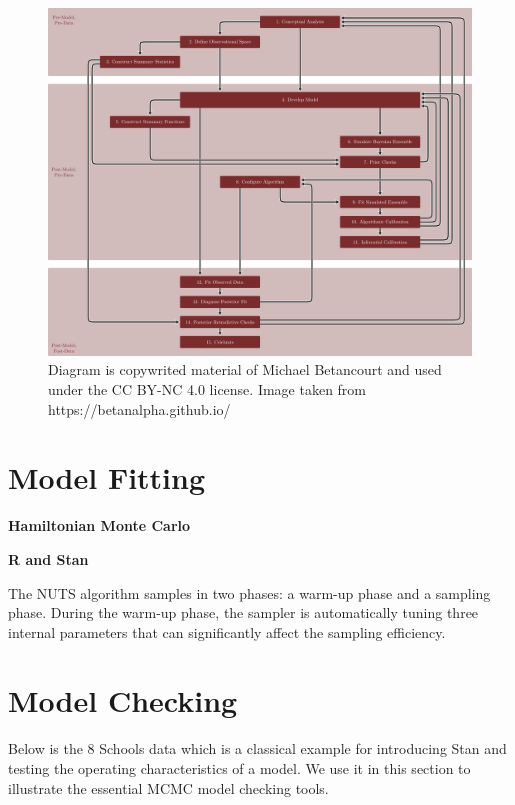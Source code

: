 \documentclass[11pt, oneside, openany]{scrbook}
\begin{document}
\begin{figure}

{\centering \includegraphics[width=1\linewidth]{figures/workflow-diagram} 

}

\caption{Diagram is copywrited material of Michael Betancourt and used under the CC BY-NC 4.0 license. Image taken from https://betanalpha.github.io/}\label{fig:ch030-workflow-diagram}
\end{figure}

\hypertarget{model-fitting}{%
\section{Model Fitting}\label{model-fitting}}

\textbf{Hamiltonian Monte Carlo}

\textbf{R and Stan}

The NUTS algorithm samples in two phases: a warm-up phase and a sampling phase. During the warm-up phase, the sampler is automatically tuning three internal parameters that can significantly affect the sampling efficiency.

\hypertarget{model-checking}{%
\section{Model Checking}\label{model-checking}}

Below is the 8 Schools data \citep{gelman2013bayesian} which is a classical example for introducing Stan and testing the operating characteristics of a model. We use it in this section to illustrate the essential MCMC model checking tools.
\end{document}
